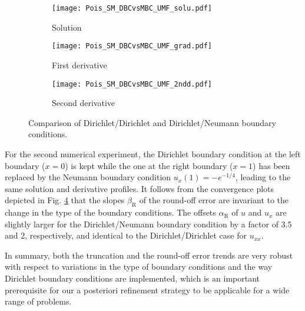 \documentclass[final,3p]{elsarticle}
\begin{document}
\begin{figure}[!ht]
    \begin{subfigure}{5.5cm}
        \texttt{[image: Pois\_SM\_DBCvsMBC\_UMF\_solu.pdf]}
        \caption{Solution}
        \label{Fig:Pois_SM_DBCvsMBC_UMF_solu}
    \end{subfigure}
    \begin{subfigure}{5.5cm}
        \texttt{[image: Pois\_SM\_DBCvsMBC\_UMF\_grad.pdf]}
        \caption{First derivative}
        \label{Fig:Pois_SM_DBCvsMBC_UMF_grad}
    \end{subfigure}
    \begin{subfigure}{5.5cm}
        \texttt{[image: Pois\_SM\_DBCvsMBC\_UMF\_2ndd.pdf]}
        \caption{Second derivative}
        \label{Fig:Pois_SM_DBCvsMBC_UMF_2ndd}
    \end{subfigure}
\caption{Comparison of Dirichlet/Dirichlet and Dirichlet/Neumann boundary conditions.}
\label{Pois_SM_DBCvsMBC}
\end{figure}

For the second numerical experiment, the Dirichlet boundary condition at the left boundary ($x=0$) is kept while the one at the right boundary ($x=1$) has been replaced by the Neumann boundary condition $u_x (1) = -e^{-1/4}$, leading to the same solution and derivative profiles. It follows from the convergence plots depicted in Fig. \ref{Pois_SM_DBCvsMBC} that the slopes $\beta_{\text{R}}$ of the round-off error are invariant to the change in the type of the boundary conditions. The offsets $\alpha_{\text{R}}$ of $u$ and $u_x$ are slightly larger for the Dirichlet/Neumann boundary condition by a factor of 3.5 and 2, respectively, and identical to the Dirichlet/Dirichlet case for $u_{xx}$.

In summary, both the truncation and the round-off error trends are very robust with respect to variations in the type of boundary conditions and the way Dirichlet boundary conditions are implemented, which is an important prerequisite for our a posteriori refinement strategy to be applicable for a wide range of problems.

\end{document}
